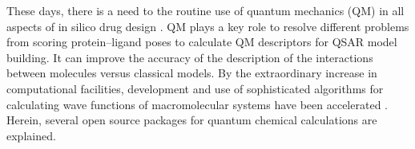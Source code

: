 These days, there is a need to the routine use of quantum mechanics (QM) in all aspects of in silico drug design \cite{Vivo_2011}. QM plays a key role to resolve different problems from scoring protein–ligand poses to calculate QM descriptors for QSAR model building. It can improve the accuracy of the description of the interactions between molecules versus classical models. By the extraordinary increase in computational facilities, development and use of sophisticated algorithms for calculating wave functions of macromolecular systems have been accelerated \cite{Merz_2010}. Herein, several open source packages for quantum chemical calculations are explained.	 